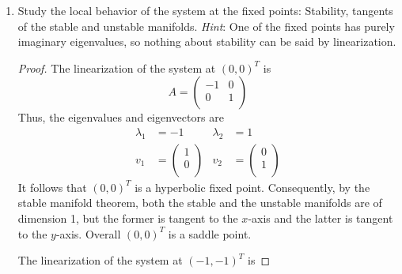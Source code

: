 \documentclass[../psets.tex]{subfiles}
\begin{document}
\begin{enumerate}
\begin{enumerate}
\begin{proof}
\begin{equation*}
{\begin{pmatrix}
                    \end{pmatrix}
                }
            \end{equation*}
        \end{proof}
        \item Study the local behavior of the system at the fixed points: Stability, tangents of the stable and unstable manifolds. \emph{Hint}: One of the fixed points has purely imaginary eigenvalues, so nothing about stability can be said by linearization.
        \begin{proof}


            The linearization of the system at $(0,0)^T$ is
            \begin{equation*}
                A =
                \begin{pmatrix}
                    -1 & 0\\
                    0 & 1\\
                \end{pmatrix}
            \end{equation*}
            Thus, the eigenvalues and eigenvectors are
            \begin{align*}
                \lambda_1 &= -1&
                    \lambda_2 &= 1\\
                v_1 &=
                \begin{pmatrix}
                    1\\
                    0\\
                \end{pmatrix}&
                    v_2 &=
                    \begin{pmatrix}
                        0\\
                        1\\
                    \end{pmatrix}
            \end{align*}
            It follows that $(0,0)^T$ is a hyperbolic fixed point. Consequently, by the stable manifold theorem, both the stable and the unstable manifolds are of dimension 1, but the former is tangent to the $x$-axis and the latter is tangent to the $y$-axis. Overall $(0,0)^T$ is a saddle point.\par
            The linearization of the system at $(-1,-1)^T$ is

\end{proof}
\end{enumerate}
\end{enumerate}
\end{document}
